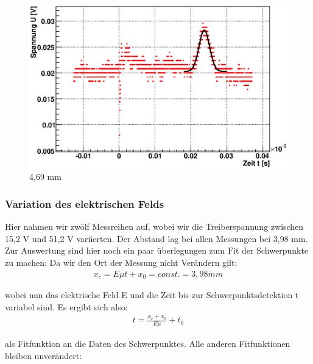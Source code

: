 \documentclass[12pt]{article}
\begin{document}
\begin{figure}[H]  
\begin{minipage}{0.33\linewidth}
\centering
\includegraphics[width=0.9\linewidth]{pictures/varDist/05.eps}
\small{4,69 mm}
\end{minipage}
\begin{minipage}{0.33\linewidth}
\centering
\end{minipage}
\begin{minipage}{0.33\linewidth}
\centering 
\end{minipage}
\end{figure}
\newpage

\subsubsection{Variation des elektrischen Felds}
Hier nahmen wir zwölf Messreihen auf, wobei wir die Treiberspannung zwischen 15,2 V und 51,2 V variierten. Der Abstand lag bei allen Messungen bei 3,98 mm. Zur Auswertung sind hier noch ein paar überlegungen zum Fit der Schwerpunkte zu machen: Da wir den Ort der Messung nicht Verändern gilt:
\begin{align*}
 x_c = E \mu t + x_0 = const. = 3,98 mm
\end{align*}

wobei nun das elektrische Feld E und die Zeit bis zur Schwerpunktsdetektion t variabel sind. Es ergibt sich also:
\begin{align*}
 t = \frac{x_c+x_0}{E \mu} + t_0
\end{align*}

als Fitfunktion an die Daten des Schwerpunktes. Alle anderen Fitfunktionen bleiben unverändert:
\end{document}
